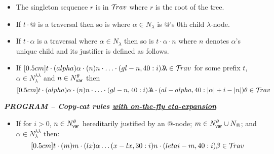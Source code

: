 \documentclass{article}
\theoremstyle{definition}
\newcommand\Nodes{N}%
\newcommand\NodesVar{N_{\sf var}}%
\newcommand\NodesLmd{N_\lambda}%
\newcommand{\ghostlmd}{{\lambda\!\!\lambda}}
\newcommand{\ghostvar}{\theta}
\begin{document}
\begin{FramedTable}
\begin{itemize}[]
    \item{} The singleton sequence $r$ is in $\mathcal{T}\!rav$ where $r$ is the root of the tree.

    \item {} If $t \cdot @$ is a traversal then so is  where $\alpha\in\NodesLmd$ is $@$'s $0$th child $\lambda$-node.

    \item {} If $t \cdot \alpha$ is a traversal where $\alpha\in\NodesLmd$ then so is
        $t \cdot \alpha \cdot n$ where $n$
        denotes $\alpha$'s unique child and its justifier is defined as follows.

    \item \rulenamet{Lam^\ghostlmd} If
  $\Pstr[0.5cm]{ t \cdot(alpha){\alpha} \cdot
(n){n} \cdot \ldots \cdot
(gl-n,40:i){\ghostlmd} \in\travset}$ for some prefix $t$, $\alpha \in \NodesLmd^\ghostlmd$ and $n \in\NodesVar^\ghostvar$ then
$$\Pstr[0.5cm]{ t \cdot(alpha){\alpha} \cdot
(n){n}
\cdot \ldots \cdot
(gl-n,40:i){\ghostlmd}\cdot (al-alpha,40:{|\alpha| + i - |n|}){\ghostvar}
      \in\travset}$$
 \end{itemize}

\emph{\bf PROGRAM -- Copy-cat rules \underline{with on-the-fly eta-expansion}}
\begin{itemize}
\item {} If  for $i>0$, $n \in \NodesVar^\ghostvar$ hereditarily justified by an $@$-node;
     $m \in \NodesVar^\ghostvar \union \Nodes_{@}$; and $\alpha \in \NodesLmd^\ghostlmd$ then:
  $$\Pstr[0.5cm]{ t  \cdot
(m){m} \cdot (lx){\alpha}  \ldots (x-lx,30:i){n}
    \cdot (letai-m,40:i){\beta}
     \in\travset}$$
\end{itemize}


\end{FramedTable}
\end{document}

